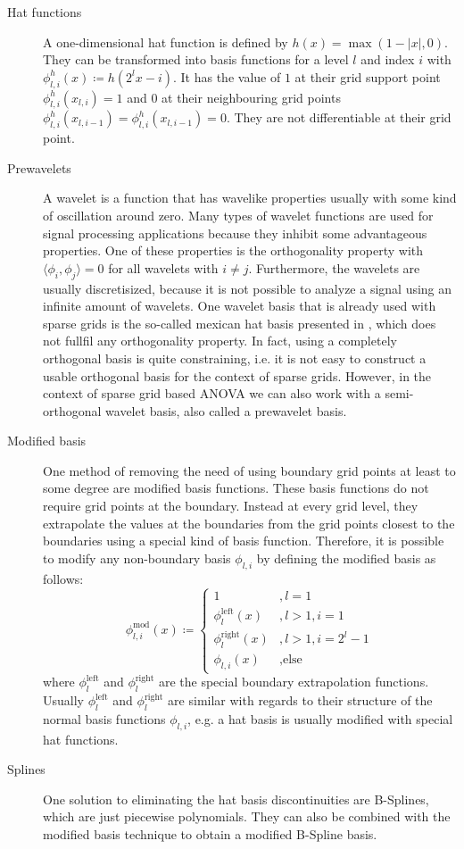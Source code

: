 \documentclass[
  a4paper,  %
  twoside,  %
  bibliography=totoc,
  headsepline,
  cleardoublepage=empty,
  parskip=half,
  draft=false
]{scrbook}
\begin{document}
\begin{description}
\item[Hat functions] A one-dimensional hat function is defined by $h(x)=\max(1 - |x|,0)$. They can be transformed into basis functions for a level $l$ and index $i$ with $\phi^h_{l,i}(x) \coloneqq h(2^lx-i)$. It has the value of $1$ at their grid support point $\phi^h_{l,i}(x_{l,i})=1$ and $0$ at their neighbouring grid points $\phi^h_{l,i}(x_{l,i-1})=\phi^h_{l,i}(x_{l,i-1})=0$. They are not differentiable at their grid point.

\item[Prewavelets] A wavelet is a function that has wavelike properties usually with some kind of oscillation around zero.
Many types of wavelet functions are used for signal processing applications because they inhibit some advantageous properties.
One of these properties is the orthogonality property with $\langle \phi_{i},\phi_{j} \rangle = 0$ for all wavelets with $i \neq j$.
Furthermore,  the wavelets are usually discretisized, because it is not possible to analyze a signal using an infinite amount of wavelets.
One wavelet basis that is already used with sparse grids is the so-called mexican hat basis presented in \cite{}, which does not fullfil any orthogonality property.
In fact, using a completely orthogonal basis is quite constraining, i.e. it is not easy to construct a usable orthogonal basis for the context of sparse grids.
However, in the context of sparse grid based ANOVA we can also work with a semi-orthogonal wavelet basis, also called a prewavelet basis.

\item[Modified basis] One method of removing the need of using boundary grid points at least to some degree are modified basis functions.
These basis functions do not require grid points at the boundary.
Instead at every grid level, they extrapolate the values at the boundaries from the grid points closest to the boundaries using a special kind of basis function.
Therefore, it is possible to modify any non-boundary basis $\phi_{l,i}$ by defining the modified basis as follows:
\begin{equation}
\phi^{\text{mod}}_{l,i}(x) \coloneqq
\begin{cases}
1 &, l=1\\
\phi^{\text{left}}_{l}(x)&, l>1, i=1\\
\phi^{\text{right}}_{l}(x)&, l>1, i=2^l - 1\\
\phi_{l,i}(x)&, \text{else}
\end{cases}
\nonumber
\end{equation}
where $\phi^{\text{left}}_{l}$ and $\phi^{\text{right}}_{l}$ are the special boundary extrapolation functions.
Usually $\phi^{\text{left}}_{l}$ and $\phi^{\text{right}}_{l}$ are similar with regards to their structure of the normal basis functions $\phi_{l,i}$, e.g. a hat basis is usually modified with special hat functions.

\item[Splines] One solution to eliminating the hat basis discontinuities are B-Splines, which are just piecewise polynomials.
They can also be combined with the modified basis technique to obtain a modified B-Spline basis.
\end{description}
\end{document}
